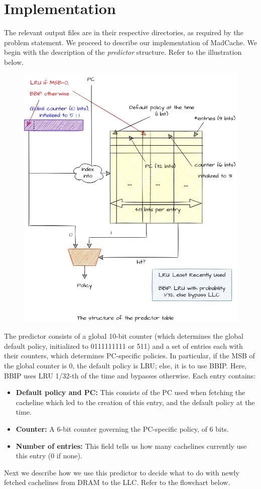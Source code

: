 \documentclass[11pt, swedish, openany]{book}
\begin{document}
\section{Implementation}
The relevant output files are in their respective directories, as required by the problem statement. We proceed to describe our implementation of MadCache. We begin with the description of the \textit{predictor} structure. Refer to the illustration below.
\begin{figure}[H]
    \centering
    \includegraphics[width=0.55\linewidth]{images/predictor.png}
\end{figure}
The predictor consists of a global 10-bit counter (which determines the global default policy, initialized to 0111111111 or 511) and a set of entries each with their counters, which determines PC-specific policies. In particular, if the MSB of the global counter is 0, the default policy is LRU; else, it is to use BBIP. Here, BBIP uses LRU 1/32-th of the time and bypasses otherwise. Each entry contains:
\begin{itemize}
    \item \textbf{Default policy and PC:} This consists of the PC used when fetching the cacheline which led to the creation of this entry, and the default policy at the time.
    \item \textbf{Counter:} A 6-bit counter governing the PC-specific policy, of 6 bits.
    \item \textbf{Number of entries:} This field tells us how many cachelines currently use this entry (0 if none).
\end{itemize}
Next we describe how we use this predictor to decide what to do with newly fetched cachelines from DRAM to the LLC. Refer to the flowchart below.
\end{document}
